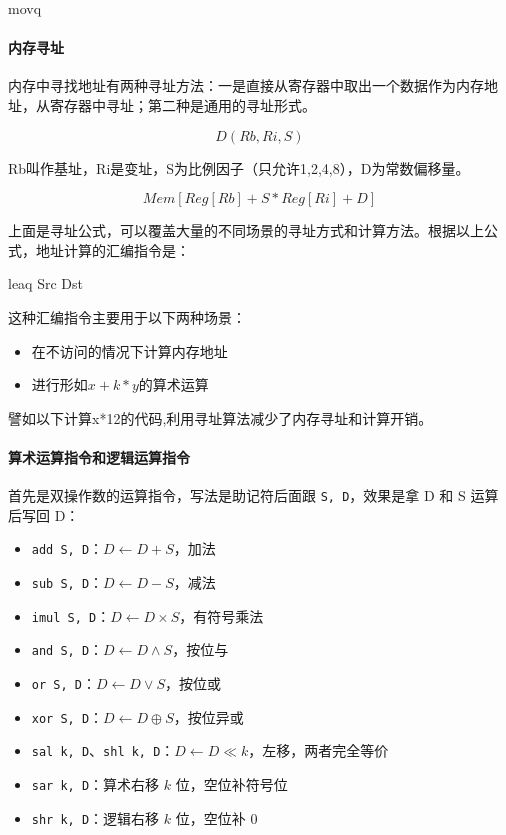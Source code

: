\begin{asmcode}
    movq %
\end{asmcode}

\paragraph{内存寻址}

内存中寻找地址有两种寻址方法：一是直接从寄存器中取出一个数据作为内存地址，从寄存器中寻址；第二种是通用的寻址形式。

$$D(Rb,Ri,S)$$

Rb叫作基址，Ri是变址，S为比例因子（只允许1,2,4,8），D为常数偏移量。

$$Mem[Reg[Rb]+S*Reg[Ri]+D]$$

上面是寻址公式，可以覆盖大量的不同场景的寻址方式和计算方法。根据以上公式，地址计算的汇编指令是：

\begin{asmcode}
    leaq Src Dst
\end{asmcode}

这种汇编指令主要用于以下两种场景：

\begin{itemize}
    \item 在不访问的情况下计算内存地址
    \item 进行形如$x + k * y$的算术运算
\end{itemize}

譬如以下计算x*12的代码,利用寻址算法减少了内存寻址和计算开销。

\paragraph{算术运算指令和逻辑运算指令}

首先是双操作数的运算指令，写法是助记符后面跟 \texttt{S, D}，效果是拿 D 和 S 运算后写回 D：

\begin{itemize}
    \item \texttt{add S, D}：$D \leftarrow D + S$，加法
    \item \texttt{sub S, D}：$D \leftarrow D - S$，减法
    \item \texttt{imul S, D}：$D \leftarrow D \times S$，有符号乘法
    \item \texttt{and S, D}：$D \leftarrow D \wedge S$，按位与
    \item \texttt{or S, D}：$D \leftarrow D \vee S$，按位或
    \item \texttt{xor S, D}：$D \leftarrow D \oplus S$，按位异或
    \item \texttt{sal k, D}、\texttt{shl k, D}：$D \leftarrow D \ll k$，左移，两者完全等价
    \item \texttt{sar k, D}：算术右移 $k$ 位，空位补符号位
    \item \texttt{shr k, D}：逻辑右移 $k$ 位，空位补 $0$
\end{itemize}

